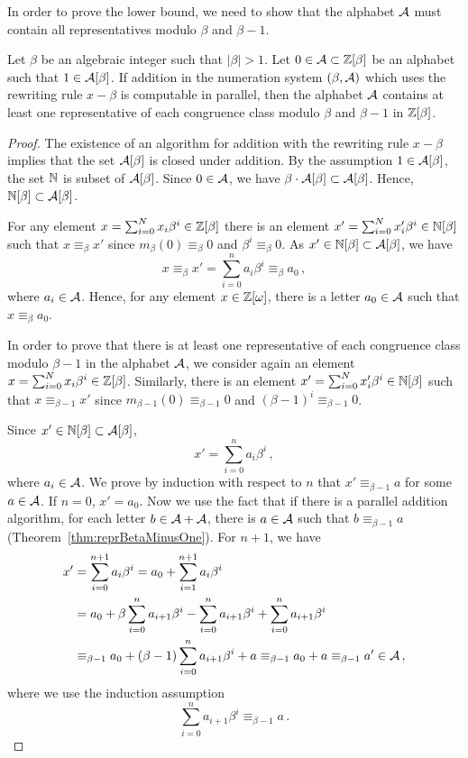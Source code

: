 In order to prove the lower bound, we need to show that the alphabet $\mathcal{A}$ must contain all representatives modulo $\beta$ and $\beta-1$. 
\begin{thm}
Let $\beta$ be an algebraic integer such that $|\beta|>1$. Let $0\in \mathcal{A}\subset \mathbb{Z}[\beta]$ be an alphabet such that $1\in \mathcal{A}[\beta]$. If addition in the numeration system $(\beta, \mathcal{A})$ which uses the rewriting rule $x-\beta$ is computable in parallel, then the alphabet $\mathcal{A}$ contains at least one representative of each congruence class modulo $\beta$ and $\beta-1$ in $\mathbb{Z}[\beta]$. 
\label{thm:representativesInAlphabet}
\end{thm}
\begin{proof}
The existence of an algorithm for addition with the rewriting rule $x-\beta$ implies that the set $\mathcal{A}[\beta]$ is closed under addition. By the assumption $1\in \mathcal{A}[\beta]$, the set $\mathbb{N}$ is subset of  $\mathcal{A}[\beta]$. Since $0\in\mathcal{A}$, we have $\beta \cdot \mathcal{A}[\beta] \subset \mathcal{A}[\beta]$. Hence, $\mathbb{N}[\beta] \subset \mathcal{A}[\beta]$.

For any element  $x=\sum_{i=0}^N x_i \beta^i\in \mathbb{Z}[\beta]$ there is an element $x'=\sum_{i=0}^N x'_i \beta^i\in \mathbb{N}[\beta]$ such that $x\equiv_\beta x'$  since $m_\beta (0)\equiv_\beta 0$ and $\beta^i\equiv_\beta 0$. As $x'\in \mathbb{N}[\beta] \subset \mathcal{A}[\beta]$, we have
$$
x\equiv_\beta x'=\sum_{i=0}^{n}a_i\beta^i \equiv_\beta a_0\,,
$$
where $a_i\in \mathcal{A}$. Hence, for any element $x\in\mathbb{Z}[\omega]$, there is a letter $a_0\in\mathcal{A}$ such that $x\equiv_\beta a_0$.

In order to prove that there is at least one representative of each congruence class modulo $\beta-1$ in the alphabet $\mathcal{A}$, we consider again an element $x=\sum_{i=0}^N x_i \beta^i\in \mathbb{Z}[\beta]$. Similarly, there is an element $x'=\sum_{i=0}^N x'_i \beta^i\in \mathbb{N}[\beta]$ such that $x\equiv_{\beta-1} x'$  since $m_{\beta-1} (0)\equiv_{\beta-1} 0$ and $(\beta-1)^i\equiv_{\beta-1} 0$.

Since $x'\in \mathbb{N}[\beta]\subset \mathcal{A}[\beta]$,
$$
x'=\sum_{i=0}^{n}a_i\beta^i\,,
$$
where $a_i\in \mathcal{A}$. We prove by induction with respect to $n$ that $x'\equiv_{\beta-1} a$ for some $a\in\mathcal{A}$.
If $n=0$, $x'=a_0$. Now we use the fact that if there is a parallel addition algorithm, for each letter $b \in\mathcal{A}+\mathcal{A}$, there is $a\in\mathcal{A}$ such that $b \equiv_{\beta-1} a$ (Theorem~\ref{thm:reprBetaMinusOne}). For $n+1$, we have
\begin{align*}
x'&=\sum_{i=0}^{n+1}a_i\beta^i =a_0 + \sum_{i=1}^{n+1}a_{i}\beta^i\\
    &=a_0 + \beta \sum_{i=0}^{n}a_{i+1}\beta^i - \sum_{i=0}^{n}a_{i+1}\beta^i+ \sum_{i=0}^{n}a_{i+1}\beta^i \\
    &\equiv_{\beta-1} a_0 + (\beta-1)\sum_{i=0}^{n}a_{i+1}\beta^i + a \equiv_{\beta-1}a_0 +a \equiv_{\beta-1}a' \in\mathcal{A}\,,
\end{align*}
where we use the induction assumption
$$
\sum_{i=0}^{n}a_{i+1}\beta^i\equiv_{\beta-1} a\,.
$$
\end{proof}
